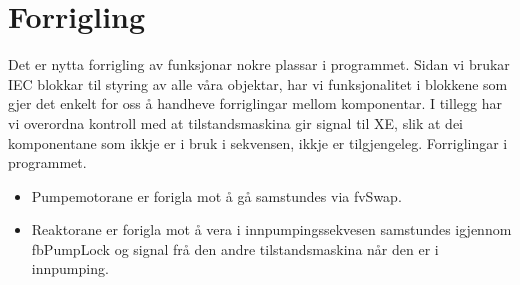 \section{Forrigling}
\thispagestyle{fancy}


Det er nytta \gls{forrigling} av funksjonar nokre plassar i programmet. 
Sidan vi brukar IEC blokkar til styring av alle våra objektar, har vi funksjonalitet i blokkene som gjer det enkelt for oss å 
handheve forriglingar mellom komponentar.
I tillegg har vi overordna kontroll med at tilstandsmaskina gir signal til XE, 
slik at dei komponentane som ikkje er i bruk i sekvensen, ikkje er tilgjengeleg.
Forriglingar i programmet.

\begin{itemize}
    \item Pumpemotorane er forigla mot å gå samstundes via fvSwap.
    \item Reaktorane er forigla mot å vera i innpumpingssekvesen samstundes igjennom fbPumpLock 
    og signal frå den andre tilstandsmaskina når den er i innpumping.
\end{itemize}


\newpage









